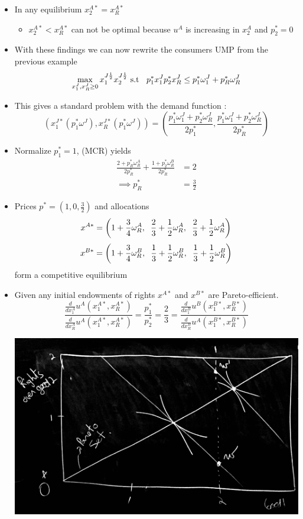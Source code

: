 \documentclass[twoside]{article}
\begin{document}
\begin{itemize}
\begin{itemize}
\end{itemize}
\item In any equilibrium \(x_2^{A*} = x_R^{A*}\)
\begin{itemize}
\item \(x_2^{A*} < x_R^{A*} \) can not be optimal because \(u^A\) is increasing in \(x_2^A\) and \(p_2^* = 0\)
\end{itemize}
\item With these findings we can now rewrite the consumers UMP from the previous example
\[\max_{x_1^J, x_R^J \geq 0}  x_1^{J\frac{1}{2}}x_2^{J \frac{1}{2}} \text{ s.t } \hspace{0.2cm} p_1^* x_1^J  p_2^* x_R^J \leq p_1^* \omega_1^J + p_R^* \omega_R^J\]
\item This gives a standard problem with the demand function : 
\[(x_1^{J*} (p_1^* \omega^J), x_R^{J*}(p_1^* \omega^J)) = 
\left( \frac{p_1^* \omega^J_1 + p_2^* \omega_R^J }{2p_1^*}, \frac{p_1^* \omega^J_1 + p_2^* \omega_R^J }{2p_R^*} \right)\]
\item Normalize \(p_1^* = 1\), (MCR) yields 
\[\begin{aligned}
\frac{2 + p_R^* \omega_R^A}{2p_R^* } + \frac{1 + p_2^* \omega_R^B }{2p_R^*} & = 2 \\
\implies p_R^* &  = \frac{3}{2}
\end{aligned}\]
\item Prices \(p^* = (1, 0 , \frac{3}{2})\) and allocations
\[x^{A*} = \left(1 + \frac{3}{4} \omega^A_R, \hspace{0.2cm} \frac{2}{3} + \frac{1}{2} \omega_R^A, \hspace{0.2cm} \frac{2}{3} + \frac{1}{2} \omega^A_R\right)\]
\[x^{B*} = \left(1 + \frac{3}{4} \omega^B_R, \hspace{0.2cm} \frac{1}{3} + \frac{1}{2} \omega_R^B, \hspace{0.2cm} \frac{1}{3} + \frac{1}{2} \omega^B_R\right)\]
form a competitive equilibrium
\item Given any initial endowments of rights \(x^{A*}\) and \(x^{B*}\) are Pareto-efficient. 
\[\frac{\frac{d}{dx_1^A} u^A(x_1^{A*}, x_R^{A*})}{\frac{d}{dx_R^A} u^A(x_1^{A*}, x_R^{A*})} = \frac{p_1^* }{p_2^*} = \frac{2}{3} = \frac{\frac{d}{dx_1^B} u^B(x_1^{B*}, x_R^{B*})}{\frac{d}{dx_R^B} u^A(x_1^{B*}, x_R^{B*})} \]
\begin{center}
\includegraphics[scale=0.1]{31}

\end{center}
\end{itemize}
\end{document}
